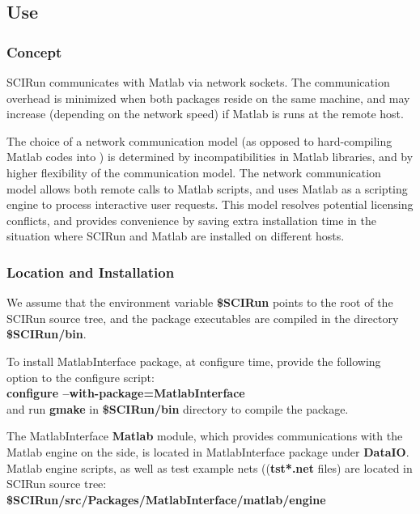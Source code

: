 \subsection{Use}

\subsubsection{Concept} \indent

SCIRun communicates with Matlab via network sockets. The communication
overhead is minimized when both packages reside on the same machine,
and may increase (depending on the network speed) if Matlab is
runs at the remote host.

The choice of a network communication model (as opposed to hard-compiling
Matlab codes into \sr{}) is determined by incompatibilities in Matlab
libraries, and by higher flexibility of the communication model.
The network communication model allows both remote calls to Matlab
scripts, and uses Matlab as a scripting engine to process
interactive user requests. This model resolves potential licensing
conflicts, and provides convenience by saving extra installation time
in the situation where SCIRun and Matlab are installed on different hosts.

\subsubsection{Location and Installation} \indent

We assume that the environment variable {\bf \$SCIRun} points to the root
of the SCIRun source tree, and the package executables are compiled in the
directory {\bf \$SCIRun/bin}.

To install MatlabInterface package, at configure time, provide the
following option to the configure script: \\
{\bf configure --with-package=MatlabInterface} \\
and run {\bf gmake } in {\bf \$SCIRun/bin} directory
to compile the package. 

The MatlabInterface {\bf Matlab} module, which provides communications with 
the Matlab engine on the \sr{} side, is located in MatlabInterface 
package under {\bf DataIO}. Matlab engine scripts, as well as test 
example nets (({\bf tst*.net} files) are located in SCIRun source tree: \\
{\bf \$SCIRun/src/Packages/MatlabInterface/matlab/engine }\\

